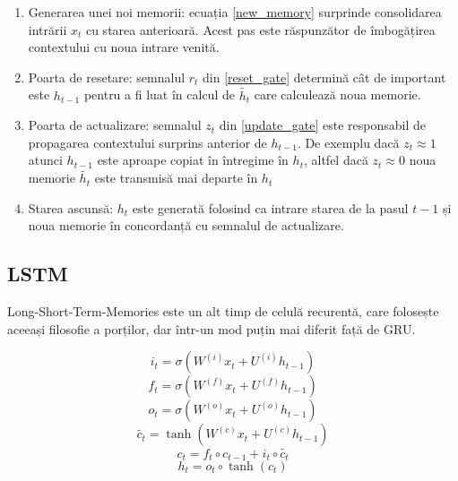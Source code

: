 \begin{enumerate}
	\item Generarea unei noi memorii: ecuația \ref{new_memory} surprinde consolidarea intrării $x_t$ cu starea anterioară. Acest pas este răspunzător de îmbogățirea contextului cu noua intrare venită.
	\item Poarta de resetare: semnalul $r_t$ din \ref{reset_gate} determină cât de important este $h_{t-1}$ pentru a fi luat în calcul de $\widetilde{h_t}$ care calculează noua memorie.
	\item Poarta de actualizare: semnalul $z_t$ din \ref{update_gate}  este responsabil de propagarea contextului surprins anterior de $h_{t-1}$. De exemplu dacă $ z_t \approx 1$ atunci $h_{t-1}$ este aproape copiat în întregime în $h_t$, altfel dacă $ z_t \approx 0$ noua memorie $\widetilde{h_t}$ este transmisă mai departe în $h_t$
	\item Starea ascunsă: $h_t$ este generată folosind ca intrare starea de la pasul $t-1$ și noua memorie în concordanță cu semnalul de actualizare.
\end{enumerate}

\subsection{LSTM}
Long-Short-Term-Memories este un alt timp de celulă recurentă, care folosește aceeași filosofie a porților, dar într-un mod puțin mai diferit față de GRU.

\begin{equation}
	i_t = \sigma(W^{(i)}  x_t + U^{(i)} h_{t-1})
	\label{input_gate}
\end{equation}
\begin{equation}
	f_t = \sigma(W^{(f)} x_t + U^{(f)} h_{t-1})
	\label{forget_gate}
\end{equation}
\begin{equation}
	o_t = \sigma(W^{(o)} x_t + U^{(o)} h_{t-1})
	\label{output_gate}
\end{equation}
\begin{equation}
	\widetilde{c_t} = \tanh(W^{(c)} x_t + U^{(c)} h_{t-1})
	\label{new_memory_cell}
\end{equation}
\begin{equation}
	c_t = f_t \circ c_{t-1} + i_t \circ \widetilde{c_t}
	\label{final_memory}
\end{equation}
\begin{equation}
	h_t = o_t \circ \tanh(c_t)
	\label{hidden_state_lstml}
\end{equation}

